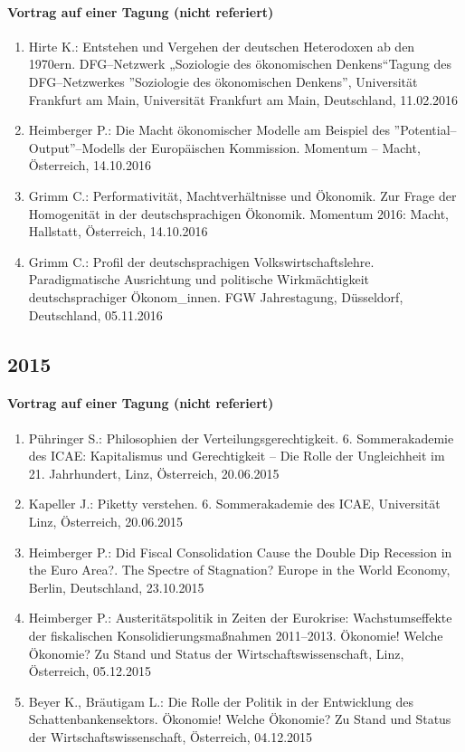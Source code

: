 \paragraph{Vortrag auf einer Tagung (nicht referiert)}
\begin{enumerate}
	\item Hirte K.: Entstehen und Vergehen der deutschen Heterodoxen ab den 1970ern. DFG--Netzwerk „Soziologie des ökonomischen Denkens“Tagung des DFG--Netzwerkes ''Soziologie des ökonomischen Denkens'', Universität Frankfurt am Main, Universität Frankfurt am Main, Deutschland, 11.02.2016
	\item Heimberger P.: Die Macht ökonomischer Modelle am Beispiel des ''Potential--Output''--Modells der Europäischen Kommission. Momentum -- Macht, Österreich, 14.10.2016
	\item Grimm C.: Performativität, Machtverhältnisse und Ökonomik. Zur Frage der Homogenität in der deutschsprachigen Ökonomik. Momentum 2016: Macht, Hallstatt, Österreich, 14.10.2016
	\item Grimm C.: Profil der deutschsprachigen Volkswirtschaftslehre. Paradigmatische Ausrichtung und politische Wirkmächtigkeit deutschsprachiger Ökonom\_innen. FGW Jahrestagung, Düsseldorf, Deutschland, 05.11.2016
\end{enumerate}
\subsection*{2015}
\paragraph{Vortrag auf einer Tagung (nicht referiert)}
\begin{enumerate}
	\item Pühringer S.: Philosophien der Verteilungsgerechtigkeit. 6. Sommerakademie des ICAE: Kapitalismus und Gerechtigkeit -- Die Rolle der Ungleichheit im 21. Jahrhundert, Linz, Österreich, 20.06.2015
	\item Kapeller J.: Piketty verstehen. 6. Sommerakademie des ICAE, Universität Linz, Österreich, 20.06.2015
	\item Heimberger P.: Did Fiscal Consolidation Cause the Double Dip Recession in the Euro Area?. The Spectre of Stagnation? Europe in the World Economy, Berlin, Deutschland, 23.10.2015
	\item Heimberger P.: Austeritätspolitik in Zeiten der Eurokrise: Wachstumseffekte der fiskalischen Konsolidierungsmaßnahmen 2011--2013. Ökonomie! Welche Ökonomie? Zu Stand und Status der Wirtschaftswissenschaft, Linz, Österreich, 05.12.2015
	\item Beyer K., Bräutigam L.: Die Rolle der Politik in der Entwicklung des Schattenbankensektors. Ökonomie! Welche Ökonomie? Zu Stand und Status der Wirtschaftswissenschaft, Österreich, 04.12.2015
\end{enumerate}
